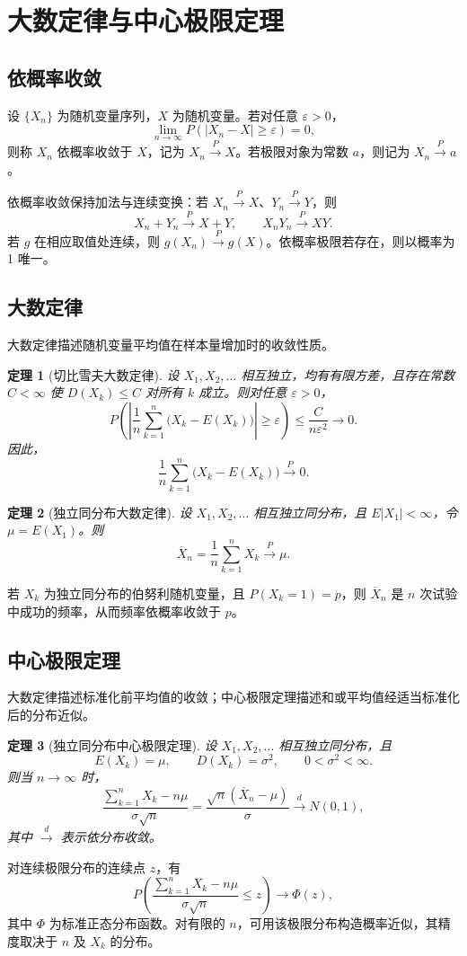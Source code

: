 \documentclass[11pt,a4paper,fontset=fandol]{ctexart}
\newtheorem{theorem}{定理}[section]
\theoremstyle{remark}
\begin{document}
\clearpage
\section{大数定律与中心极限定理}
\subsection{依概率收敛}
设 $\{X_n\}$ 为随机变量序列，$X$ 为随机变量。若对任意 $\varepsilon>0$，
\[
    \lim_{n\to\infty}P(|X_n-X|\geq\varepsilon)=0,
\]
则称 $X_n$ 依概率收敛于 $X$，记为 $X_n\xrightarrow{P}X$。若极限对象为常数 $a$，则记为 $X_n\xrightarrow{P}a$。

依概率收敛保持加法与连续变换：若 $X_n\xrightarrow{P}X$、$Y_n\xrightarrow{P}Y$，则
\[
    X_n+Y_n\xrightarrow{P}X+Y,\qquad
    X_nY_n\xrightarrow{P}XY.
\]
若 $g$ 在相应取值处连续，则 $g(X_n)\xrightarrow{P}g(X)$。依概率极限若存在，则以概率为 1 唯一。

\subsection{大数定律}
大数定律描述随机变量平均值在样本量增加时的收敛性质。

\begin{theorem}[切比雪夫大数定律]
设 $X_1,X_2,\ldots$ 相互独立，均有有限方差，且存在常数 $C<\infty$ 使 $D(X_k)\leq C$ 对所有 $k$ 成立。则对任意 $\varepsilon>0$，
\[
    P\left(
        \left|\frac1n\sum_{k=1}^{n}\bigl(X_k-E(X_k)\bigr)\right|
        \geq\varepsilon
    \right)
    \leq \frac{C}{n\varepsilon^2}
    \longrightarrow 0.
\]
因此，
\[
    \frac1n\sum_{k=1}^{n}\bigl(X_k-E(X_k)\bigr)
    \xrightarrow{P}0.
\]
\end{theorem}

\begin{theorem}[独立同分布大数定律]
设 $X_1,X_2,\ldots$ 相互独立同分布，且 $E|X_1|<\infty$，令 $\mu=E(X_1)$。则
\[
    \overline X_n=\frac1n\sum_{k=1}^{n}X_k
    \xrightarrow{P}\mu.
\]
\end{theorem}
若 $X_k$ 为独立同分布的伯努利随机变量，且 $P(X_k=1)=p$，则 $\overline X_n$ 是 $n$ 次试验中成功的频率，从而频率依概率收敛于 $p$。

\subsection{中心极限定理}
大数定律描述标准化前平均值的收敛；中心极限定理描述和或平均值经适当标准化后的分布近似。

\begin{theorem}[独立同分布中心极限定理]
设 $X_1,X_2,\ldots$ 相互独立同分布，且
\[
    E(X_k)=\mu,\qquad D(X_k)=\sigma^2,\qquad 0<\sigma^2<\infty.
\]
则当 $n\to\infty$ 时，
\[
    \frac{\sum_{k=1}^{n}X_k-n\mu}{\sigma\sqrt n}
    =\frac{\sqrt n(\overline X_n-\mu)}{\sigma}
    \xrightarrow{d}N(0,1),
\]
其中 $\xrightarrow{d}$ 表示依分布收敛。
\end{theorem}
对连续极限分布的连续点 $z$，有
\[
    P\left(
        \frac{\sum_{k=1}^{n}X_k-n\mu}{\sigma\sqrt n}\leq z
    \right)
    \longrightarrow \Phi(z),
\]
其中 $\Phi$ 为标准正态分布函数。对有限的 $n$，可用该极限分布构造概率近似，其精度取决于 $n$ 及 $X_k$ 的分布。
\end{document}
